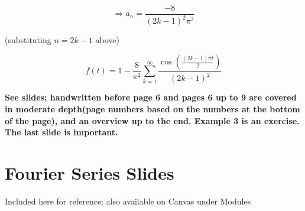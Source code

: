 $$\Rightarrow a_n = \frac{-8}{(2k-1)^2 \pi^2}$$

(substituting $n = 2k-1$ above)

$$f(t) = 1 - \frac{8}{\pi^2} \sum_{k = 1}^\infty \frac{\cos \left( \frac{(2k-1) \pi t}{2} \right)}{(2k-1)^2}$$

\textbf{See slides; handwritten before page 6 and pages 6 up to 9 are covered in moderate depth(page numbers based on the numbers at the bottom of the page), and an overview up to the end. Example 3 is an exercise. The last slide is important.}

\section{Fourier Series Slides}

Included here for reference; also available on Canvas under Modules


